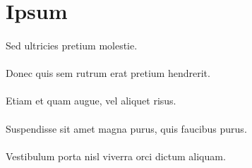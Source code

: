 \section{Ipsum}
\paragraph{}
Sed ultricies pretium molestie.

\paragraph{}
Donec quis sem rutrum erat pretium hendrerit.

\paragraph{}
Etiam et quam augue, vel aliquet risus.

\paragraph{}
Suspendisse sit amet magna purus, quis faucibus purus. 

\paragraph{}
Vestibulum porta nisl viverra orci dictum aliquam.

